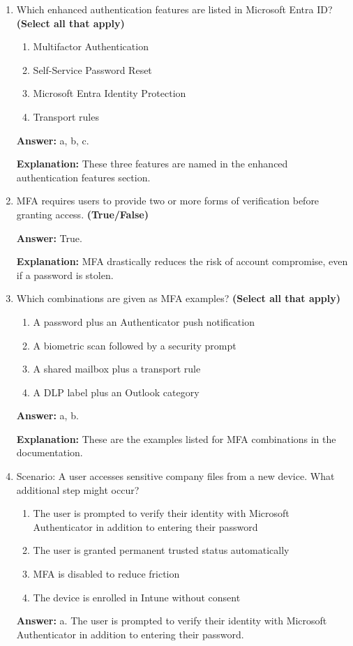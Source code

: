 \documentclass[10pt]{article}
\begin{document}
\begin{enumerate}[leftmargin=*]
\item Which enhanced authentication features are listed in Microsoft Entra ID? \textbf{(Select all that apply)}
\begin{enumerate}[label=\alph*., leftmargin=1.5em]
\item Multifactor Authentication
\item Self-Service Password Reset
\item Microsoft Entra Identity Protection
\item Transport rules
\end{enumerate}
\textbf{Answer:} a, b, c.

\textbf{Explanation:} These three features are named in the enhanced authentication features section.

\item MFA requires users to provide two or more forms of verification before granting access. \textbf{(True/False)}

\textbf{Answer:} True.

\textbf{Explanation:} MFA drastically reduces the risk of account compromise, even if a password is stolen.

\item Which combinations are given as MFA examples? \textbf{(Select all that apply)}
\begin{enumerate}[label=\alph*., leftmargin=1.5em]
\item A password plus an Authenticator push notification
\item A biometric scan followed by a security prompt
\item A shared mailbox plus a transport rule
\item A DLP label plus an Outlook category
\end{enumerate}
\textbf{Answer:} a, b.

\textbf{Explanation:} These are the examples listed for MFA combinations in the documentation.

\item Scenario: A user accesses sensitive company files from a new device. What additional step might occur?
\begin{enumerate}[label=\alph*., leftmargin=1.5em]
\item The user is prompted to verify their identity with Microsoft Authenticator in addition to entering their password
\item The user is granted permanent trusted status automatically
\item MFA is disabled to reduce friction
\item The device is enrolled in Intune without consent
\end{enumerate}
\textbf{Answer:} a. The user is prompted to verify their identity with Microsoft Authenticator in addition to entering their password.


\end{enumerate}
\end{document}
